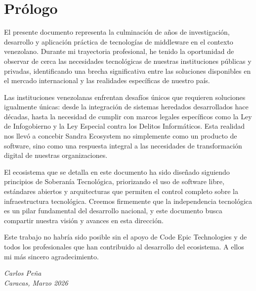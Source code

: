 \chapter*{Prólogo}

El presente documento representa la culminación de años de investigación, desarrollo y aplicación práctica de tecnologías de middleware en el contexto venezolano. Durante mi trayectoria profesional, he tenido la oportunidad de observar de cerca las necesidades tecnológicas de nuestras instituciones públicas y privadas, identificando una brecha significativa entre las soluciones disponibles en el mercado internacional y las realidades específicas de nuestro país.

Las instituciones venezolanas enfrentan desafíos únicos que requieren soluciones igualmente únicas: desde la integración de sistemas heredados desarrollados hace décadas, hasta la necesidad de cumplir con marcos legales específicos como la Ley de Infogobierno y la Ley Especial contra los Delitos Informáticos. Esta realidad nos llevó a concebir Sandra Ecosystem no simplemente como un producto de software, sino como una respuesta integral a las necesidades de transformación digital de nuestras organizaciones.

El ecosistema que se detalla en este documento ha sido diseñado siguiendo principios de Soberanía Tecnológica, priorizando el uso de software libre, estándares abiertos y arquitecturas que permiten el control completo sobre la infraestructura tecnológica. Creemos firmemente que la independencia tecnológica es un pilar fundamental del desarrollo nacional, y este documento busca compartir nuestra visión y avances en esta dirección.

Este trabajo no habría sido posible sin el apoyo de Code Epic Technologies y de todos los profesionales que han contribuido al desarrollo del ecosistema. A ellos mi más sincero agradecimiento.

\vspace{1cm}
\begin{flushright}
\textit{Carlos Peña\\
Caracas, Marzo 2026}
\end{flushright}

\newpage
